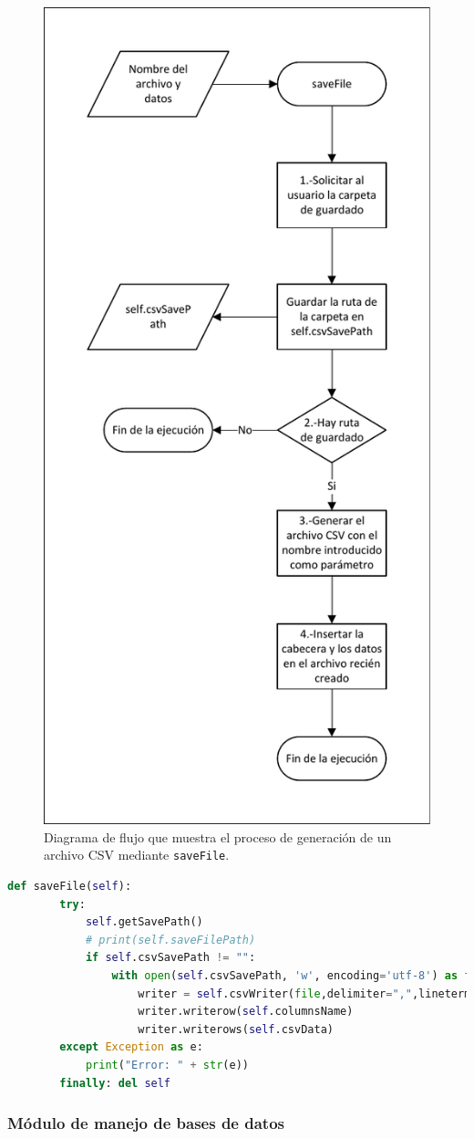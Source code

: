\begin{figure}[H]
\centering
\includegraphics[width=.42\textwidth]{fig/Diagramas de flujo/saveFile-CSV.pdf}
\caption{Diagrama de flujo que muestra el proceso de generación de un archivo \acrshort{CSV} mediante \texttt{saveFile}.}
\label{fig:DiagramaFlujoSaveFileCsv}
\end{figure}

\begin{lstlisting}[language=Python,
                   style=python,
                   frame=none,
                   numbers=none,
                   basicstyle=\ttfamily\normalsize,
                   caption={Función \texttt{saveFile}},
                   label=src:functionCsvSaveFile,
                   inputencoding=utf8]                   
    def saveFile(self):
        try:
            self.getSavePath()
            # print(self.saveFilePath)
            if self.csvSavePath != "":
                with open(self.csvSavePath, 'w', encoding='utf-8') as file:
                    writer = self.csvWriter(file,delimiter=",",lineterminator="\n")
                    writer.writerow(self.columnsName)
                    writer.writerows(self.csvData)
        except Exception as e:
            print("Error: " + str(e))
        finally: del self
\end{lstlisting}

\subsubsection{Módulo de manejo de bases de datos}

